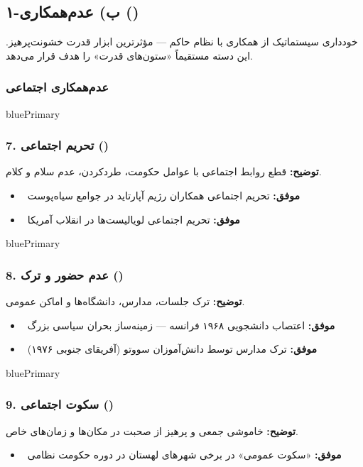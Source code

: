 \documentclass[a4paper,12pt]{article}
\newcommand{\success}[1]{\textcolor{greenPrimary}{\faCheckCircle\ \textbf{موفق:}} #1}
\newcommand{\methodnum}[1]{\textcolor{purpleLight}{\textbf{#1.}}}
\begin{document}
\subsection{\textcolor{bluePrimary}{\faCircle[regular]} ۱-ب) عدم‌همکاری ()}

خودداری سیستماتیک از همکاری با نظام حاکم — مؤثرترین ابزار قدرت خشونت‌پرهیز. این دسته مستقیماً «ستون‌های قدرت» را هدف قرار می‌دهد.

\subsubsection*{عدم‌همکاری اجتماعی}

\begin{methodcard}{bluePrimary}
\subsubsection{\methodnum{7} تحریم اجتماعی ()}
\textbf{توضیح:} قطع روابط اجتماعی با عوامل حکومت، طردکردن، عدم سلام و کلام.

\begin{itemize}[label=\textcolor{greenPrimary}{\faCheckCircle}]
  \item \success{تحریم اجتماعی همکاران رژیم آپارتاید در جوامع سیاه‌پوست}
  \item \success{تحریم اجتماعی لویالیست‌ها در انقلاب آمریکا}
\end{itemize}
\end{methodcard}

\begin{methodcard}{bluePrimary}
\subsubsection{\methodnum{8} عدم حضور و ترک ()}
\textbf{توضیح:} ترک جلسات، مدارس، دانشگاه‌ها و اماکن عمومی.

\begin{itemize}[label=\textcolor{greenPrimary}{\faCheckCircle}]
  \item \success{اعتصاب دانشجویی ۱۹۶۸ فرانسه — زمینه‌ساز بحران سیاسی بزرگ}
  \item \success{ترک مدارس توسط دانش‌آموزان سووتو (آفریقای جنوبی ۱۹۷۶)}
\end{itemize}
\end{methodcard}

\begin{methodcard}{bluePrimary}
\subsubsection{\methodnum{9} سکوت اجتماعی ()}
\textbf{توضیح:} خاموشی جمعی و پرهیز از صحبت در مکان‌ها و زمان‌های خاص.

\begin{itemize}[label=\textcolor{greenPrimary}{\faCheckCircle}]
  \item \success{«سکوت عمومی» در برخی شهرهای لهستان در دوره حکومت نظامی}
\end{itemize}
\end{methodcard}
\end{document}
